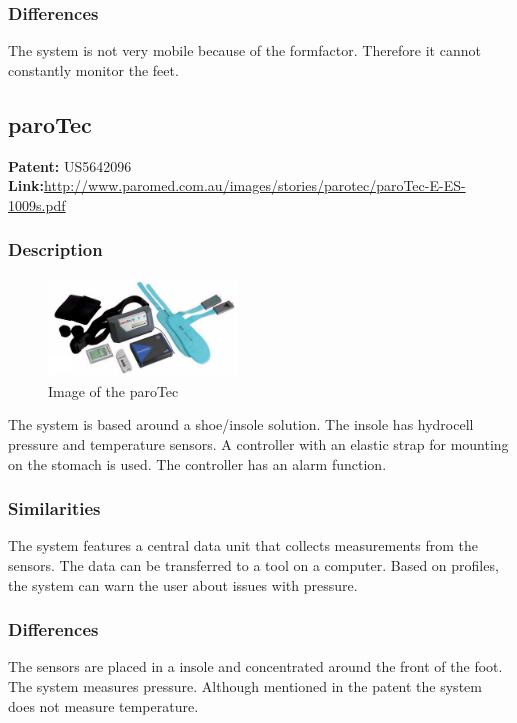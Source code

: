 \subsubsection{Differences}
The system is not very mobile because of the formfactor. Therefore it cannot constantly monitor the feet.\\


\subsection{paroTec}
\textbf{Patent:} US5642096\\
\textbf{Link:}\url{http://www.paromed.com.au/images/stories/parotec/paroTec-E-ES-1009s.pdf}
\subsubsection{Description}
\begin{figure}
\includegraphics[width=5cm]{billeder/parotec}
\caption{Image of the paroTec}
\end{figure}
The system is based around a shoe/insole solution. The insole has hydrocell pressure and temperature sensors. A controller with an elastic strap for mounting on the stomach is used. The controller has an alarm function.
\subsubsection{Similarities}
The system features a central data unit that collects measurements from the sensors. The data can be transferred to a tool on a computer. Based on profiles, the system can warn the user about issues with pressure. 
\subsubsection{Differences}
The sensors are placed in a insole and concentrated around the front of the foot. The system measures pressure. Although mentioned in the patent the system does not measure temperature.


